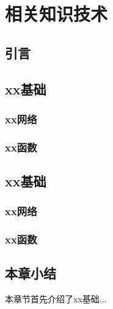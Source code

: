 \chapter{相关知识技术}
\section{引言}

\section{xx基础}

\subsection{xx网络}

\subsection{xx函数}

\section{xx基础}
\subsection{xx网络}

\subsection{xx函数}

\section{本章小结}
本章节首先介绍了xx基础...